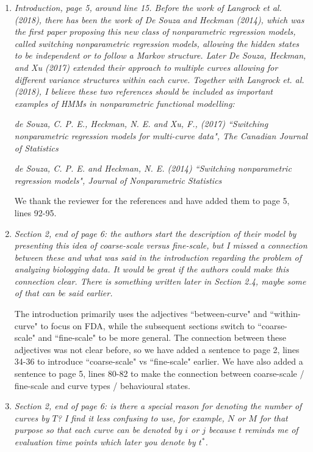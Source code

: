 \documentclass{article}
\begin{document}
\begin{enumerate}
    \item \textit{Introduction, page 5, around line 15. Before the work of Langrock et al. (2018), there has been the work of De Souza and Heckman (2014), which was the first paper proposing this new class of nonparametric regression models, called switching nonparametric regression models, allowing the hidden states to be independent or to follow a Markov structure. Later De Souza, Heckman, and Xu (2017) extended their approach to multiple curves allowing for different variance structures within each curve. Together with Langrock et. al. (2018), I believe these two references should be included as important examples of HMMs in nonparametric functional modelling:}
    
    \textit{de Souza, C. P. E., Heckman, N. E. and Xu, F., (2017) ``Switching nonparametric regression models for multi-curve data", The Canadian Journal of Statistics}

    \textit{de Souza, C. P. E. and Heckman, N. E. (2014) ``Switching nonparametric regression models", Journal of Nonparametric Statistics}
    
    We thank the reviewer for the references and have added them to page 5, lines 92-95.
    
    \item \textit{Section 2, end of page 6: the authors start the description of their model by presenting this idea of coarse-scale versus fine-scale, but I missed a connection between these and what was said in the introduction regarding the problem of analyzing biologging data. It would be great if the authors could make this connection clear. There is something written later in Section 2.4, maybe some of that can be said earlier.}
    
    The introduction primarily uses the adjectives ``between-curve" and ``within-curve" to focus on FDA, while the subsequent sections switch to ``coarse-scale" and ``fine-scale" to be more general. The connection between these adjectives was not clear before, so we have added a sentence to page 2, lines 34-36 to introduce ``coarse-scale" vs ``fine-scale" earlier. We have also added a sentence to page 5, lines 80-82 to make the connection between coarse-scale / fine-scale and curve types / behavioural states.
    
    \item \textit{Section 2, end of page 6: is there a special reason for denoting the number of curves by $T$? I find it less confusing to use, for example, $N$ or $M$ for that purpose so that each curve can be denoted by $i$ or $j$ because $t$ reminds me of evaluation time points which later you denote by $t^*$.}
    

\end{enumerate}
\end{document}
